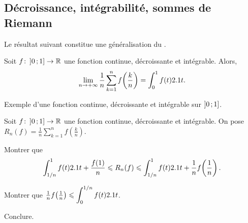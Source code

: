 

\subsection{Décroissance, intégrabilité, sommes de Riemann}

Le résultat suivant constitue une généralisation du .

\begin{prop}
    Soit $\fonctionens[f]{\interof{0}{1}}{\R}$ une fonction continue, décroissante et intégrable. Alors,
    \[
    \lim\limits_{n \to +\infty} \frac{1}{n} \sum\limits_{k=1}^n f\mathopen{}\left(\frac{k}{n}\right) =\int_0^1 f(t) \d t.
    \]
\end{prop}

\begin{marginfigure}
    \centering
    
    \caption{Exemple d'une fonction continue, décroissante et intégrable sur $\interof{0}{1}$.}
\end{marginfigure}

\begin{exercice}
Soit $\fonctionens[f]{\interof{0}{1}}{\R}$ une fonction continue, décroissante et intégrable. On pose \mbox{$R_n(f) = \frac{1}{n} \sum\limits_{k=1}^n f\mathopen{}\left(\frac{k}{n}\right)$}.
\begin{questions}
\item Montrer que
\[
\displaystyle\int_{1/n}^1 f(t) \d t + \frac{f(1)}{n}
\leqslant R_n(f)
\leqslant \displaystyle\int_{1/n}^1 f(t) \d t + \frac{1}{n}  f\mathopen{}\left(\frac{1}{n}\right).
\]

\item Montrer que $\frac{1}{n} f\mathopen{}\left(\frac{1}{n}\right) \leqslant \displaystyle\int_0^{1/n} f(t) \d t$.

\item Conclure.
\end{questions}
\end{exercice}



